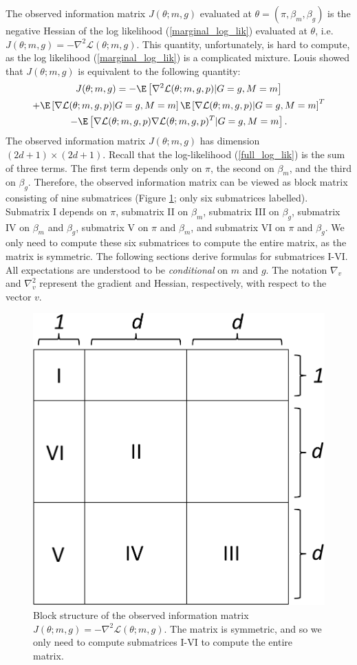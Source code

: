 \documentclass[11pt]{article}
\begin{document}
\begin{appendices}
\begin{refsection}
The observed information matrix $J(\theta; m, g)$ evaluated at $\theta = (\pi, \beta_m, \beta_g)$ is the negative Hessian of the log likelihood (\ref{marginal_log_lik}) evaluated at $\theta$, i.e.
$J(\theta; m, g) = - \nabla^2\mathcal{L}(\theta; m, g) .$ This quantity, unfortunately, is hard to compute, as the log likelihood (\ref{marginal_log_lik}) is a complicated mixture. Louis \cite{Louis1982} showed that $J(\theta; m, g)$ is equivalent to the following quantity:
\begin{multline}\label{zero_inf_info_mat}
J(\theta; m, g) = -\E \left[\nabla^2 \mathcal{L}(\theta; m, g, p) | G = g, M = m \right] \\ + \E\left[\nabla \mathcal{L}(\theta; m, g, p) | G = g, M = m \right] \E\left[\nabla \mathcal{L}(\theta; m, g, p) | G = g, M = m \right]^T \\ - \E\left[ \nabla\mathcal{L}(\theta; m, g, p) \nabla \mathcal{L}(\theta; m, g, p)^T | G = g, M = m \right].
\end{multline}
The observed information matrix $J(\theta; m, g)$ has dimension $(2d+1) \times (2d + 1).$ Recall that the log-likelihood (\ref{full_log_lik}) is the sum of three terms. The first term depends only on $\pi$, the second on $\beta_m$, and the third on $\beta_g$. Therefore, the observed information matrix can be viewed as block matrix consisting of nine submatrices (Figure \ref{infomatrixbackground}; only six submatrices labelled). Submatrix I depends on $\pi$, submatrix II on $\beta_m$, submatrix III on $\beta_g$, submatrix IV on $\beta_m$ and $\beta_g$, submatrix V on $\pi$ and $\beta_m$, and submatrix VI on $\pi$ and $\beta_g$. We only need to compute these six submatrices to compute the entire matrix, as the matrix is symmetric. The following sections derive formulas for submatrices I-VI. All expectations are understood to be \textit{conditional} on $m$ and $g$. The notation $\nabla_v$  and $\nabla^2_v$  represent the gradient and Hessian, respectively, with respect to the vector $v$.

\begin{figure}
	\centering
	\includegraphics[width=0.45\linewidth]{../../figures/info_matrix/info_matrix_background}
	\caption{Block structure of the observed information matrix $J(\theta; m, g) = -\nabla^2 \mathcal{L}(\theta; m, g)$. The matrix is symmetric, and so we only need to compute submatrices I-VI to compute the entire matrix.}
	\label{infomatrixbackground}
\end{figure}


\end{refsection}
\end{appendices}
\end{document}
